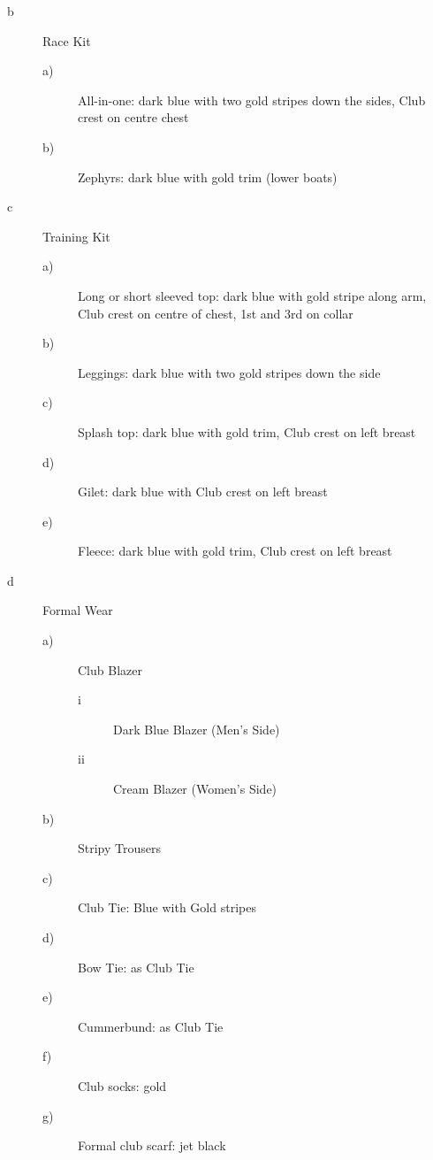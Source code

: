 \documentclass{article}
\begin{document}
\begin{description}
\begin{description}
\begin{description}
			\item[b] Race Kit
			\begin{description}
				\item[a)] All-in-one: dark blue with two gold stripes down the sides,
				Club crest on centre chest
				\item[b)] Zephyrs: dark blue with gold trim (lower boats)\\
			\end{description}
		
			\item[c] Training Kit
			\begin{description}
				\item[a)] Long or short sleeved top: dark blue with gold stripe along arm,
				Club crest on centre of chest, 1st and 3rd on collar
				\item[b)] Leggings: dark blue with two gold stripes down the side
				\item[c)] Splash top: dark blue with gold trim, Club crest on left breast
				\item[d)] Gilet: dark blue with Club crest on left breast
				\item[e)] Fleece: dark blue with gold trim, Club crest on left breast\\
			\end{description}
		
			\item[d] Formal Wear
			\begin{description}
				\item[a)] Club Blazer
				\begin{description}
					\item[i] Dark Blue Blazer (Men’s Side)
					\item[ii] Cream Blazer (Women’s Side)
				\end{description}
				\item[b)] Stripy Trousers
				\item[c)] Club Tie: Blue with Gold stripes
				\item[d)] Bow Tie: as Club Tie
				\item[e)] Cummerbund: as Club Tie
				\item[f)] Club socks: gold
				\item[g)] Formal club scarf: jet black
			\end{description}
		\end{description}
		

\end{description}
\end{description}
\end{document}
